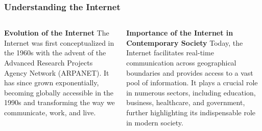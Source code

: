 \documentclass[5pt]{beamer}
\begin{document}
\begin{frame}
\frametitle{Understanding the Internet}
\begin{columns}
\begin{column}{0.45\textwidth}
\begin{block}{\textbf{Evolution of the Internet}}
The Internet was first conceptualized in the 1960s with the advent of the Advanced Research Projects Agency Network (ARPANET). It has since grown exponentially, becoming globally accessible in the 1990s and transforming the way we communicate, work, and live.
\end{block}
\end{column}
\begin{column}{0.45\textwidth}
\begin{block}{\textbf{Importance of the Internet in Contemporary Society}}
Today, the Internet facilitates real-time communication across geographical boundaries and provides access to a vast pool of information. It plays a crucial role in numerous sectors, including education, business, healthcare, and government, further highlighting its indispensable role in modern society.
\end{block}
\end{column}
\end{columns}
\end{frame}
\end{document}
